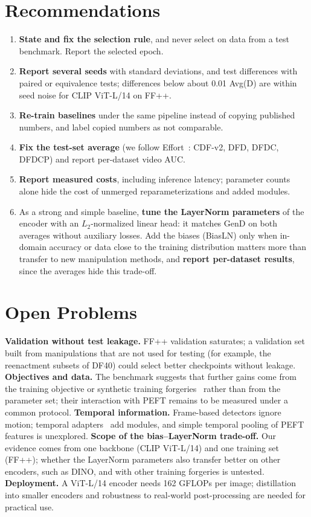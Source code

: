 \documentclass[fonts]{icst}
\begin{document}
\section{Recommendations}
\label{sec:recommend}
\begin{enumerate}[leftmargin=*, topsep=2pt, itemsep=2pt]
    \item \textbf{State and fix the selection rule}, and never select on data from a test benchmark. Report the selected epoch.
    \item \textbf{Report several seeds} with standard deviations, and test differences with paired or equivalence tests; differences below about 0.01 Avg(D) are within seed noise for CLIP ViT-L/14 on FF++.
    \item \textbf{Re-train baselines} under the same pipeline instead of copying published numbers, and label copied numbers as not comparable.
    \item \textbf{Fix the test-set average} (we follow Effort~\cite{yan2025effort}: CDF-v2, DFD, DFDC, DFDCP) and report per-dataset video AUC.
    \item \textbf{Report measured costs}, including inference latency; parameter counts alone hide the cost of unmerged reparameterizations and added modules.
    \item As a strong and simple baseline, \textbf{tune the LayerNorm parameters} of the encoder with an $L_2$-normalized linear head: it matches GenD on both averages without auxiliary losses. Add the biases (BiasLN) only when in-domain accuracy or data close to the training distribution matters more than transfer to new manipulation methods, and \textbf{report per-dataset results}, since the averages hide this trade-off.
\end{enumerate}

\section{Open Problems}
\label{sec:open}
\textbf{Validation without test leakage.} FF++ validation saturates; a validation set built from manipulations that are not used for testing (for example, the reenactment subsets of DF40) could select better checkpoints without leakage.
\textbf{Objectives and data.} The benchmark suggests that further gains come from the training objective or synthetic training forgeries~\cite{shiohara2022sbi} rather than from the parameter set; their interaction with PEFT remains to be measured under a common protocol.
\textbf{Temporal information.} Frame-based detectors ignore motion; temporal adapters~\cite{han2024fcg} add modules, and simple temporal pooling of PEFT features is unexplored.
\textbf{Scope of the bias--LayerNorm trade-off.} Our evidence comes from one backbone (CLIP ViT-L/14) and one training set (FF++); whether the LayerNorm parameters also transfer better on other encoders, such as DINO, and with other training forgeries is untested.
\textbf{Deployment.} A ViT-L/14 encoder needs 162 GFLOPs per image; distillation into smaller encoders and robustness to real-world post-processing are needed for practical use.
\end{document}

